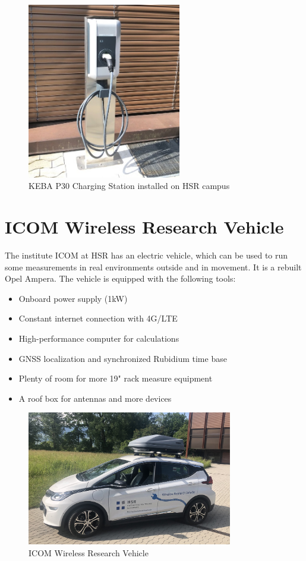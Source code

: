 \begin{figure}[htb]
	\centering
	\includegraphics [width=0.6\textwidth] {images/ChargingStationB}
	\caption{KEBA P30 Charging Station installed on HSR campus}
	\label{fig:ChargingStation}
\end{figure}

\section{ICOM Wireless Research Vehicle}

The institute ICOM at HSR has an electric vehicle, which can be used to run some measurements in real environments outside and in movement. It is a rebuilt Opel Ampera. The vehicle is equipped with the following tools: \cite{ICOMWirelessResearchVehicle}

\begin{itemize}
	\item Onboard power supply (1\;kW)
	\item Constant internet connection with 4G/LTE
	\item High-performance computer for calculations
	\item GNSS localization and synchronized Rubidium time base
	\item Plenty of room for more 19" rack measure equipment
    \item A roof box for antennas and more devices
\end{itemize}

\begin{figure}[htb]
	\centering
	\includegraphics [width=0.8\textwidth] {images/WRV}
	\caption{ICOM Wireless Research Vehicle}
	\label{fig:WRV}
\end{figure}

